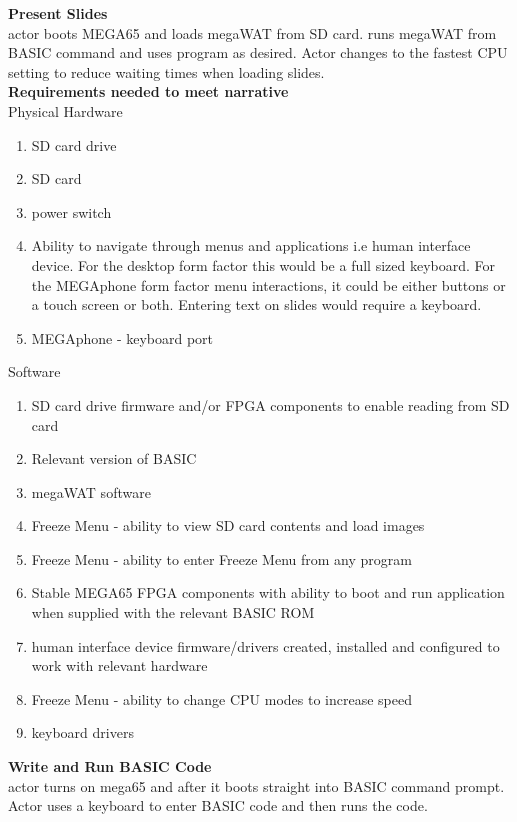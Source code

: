 \textbf{Present Slides}\\
actor boots MEGA65 and loads megaWAT from SD card. runs megaWAT from BASIC command and uses program as desired. Actor changes to the fastest CPU setting to reduce waiting times when loading slides.\\

\textbf{Requirements needed to meet narrative}\\
Physical Hardware
\begin{enumerate}
\item SD card drive
\item SD card
\item power switch
\item Ability to navigate through menus and applications i.e human interface device. For the desktop form factor this would be a full sized keyboard. For the MEGAphone form factor menu interactions, it could be either buttons or a touch screen or both. Entering text on slides would require a keyboard.
\item MEGAphone - keyboard port
\end{enumerate}

Software\\
\begin{enumerate}
\item SD card drive firmware and/or FPGA components to enable reading from SD card
\item Relevant version of BASIC 
\item megaWAT software
\item Freeze Menu - ability to view SD card contents and load images
\item Freeze Menu - ability to enter Freeze Menu from any program
\item Stable MEGA65 FPGA components with ability to boot and run application when supplied with the relevant BASIC ROM
\item human interface device firmware/drivers created, installed and configured to work with relevant hardware
\item Freeze Menu - ability to change CPU modes to increase speed
\item keyboard drivers
\end{enumerate}

\textbf{Write and Run BASIC Code}\\
actor turns on mega65 and after it boots straight into BASIC command prompt. Actor uses a keyboard to enter BASIC code and then runs the code.\\

